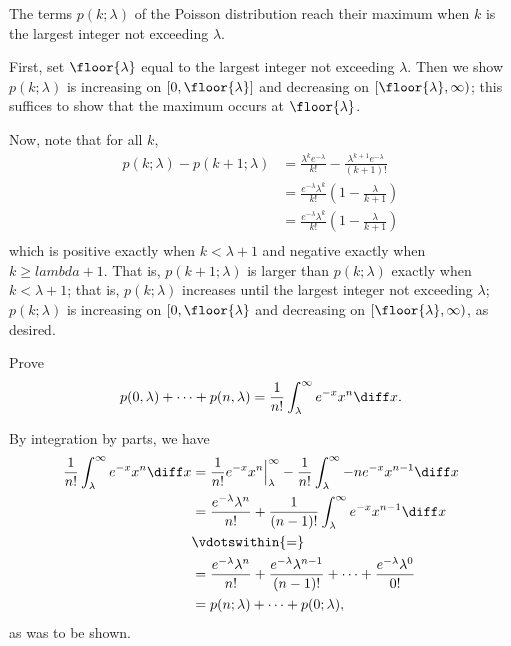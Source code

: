 \begin{problem}[Handout 10, \# 10]
  The terms \(p(k;\lambda)\) of the Poisson distribution reach their
  maximum when \(k\) is the largest integer not exceeding \(\lambda\).
\end{problem}
\begin{solution}
  First, set $\floor{\lambda}$ equal to the largest integer not exceeding
  $\lambda$. Then we show $p(k;\lambda)$ is increasing on
  $[0,\floor{\lambda}]$ and decreasing on $[\floor{\lambda}, \infty)$; this
  suffices to show that the maximum occurs at $\floor{\lambda}$.

  Now, note that for all $k$,
  \begin{align*}
    p(k; \lambda) - p(k+1;\lambda) &= \frac{\lambda^k e^{-\lambda}}{k!} -\frac{\lambda^{k+1} e^{-\lambda}}{(k+1)!}\\
                                   &= \frac{e^{-\lambda} \lambda^k}{k!} \left( 1 -\frac{\lambda}{k+1} \right)\\
                                   &= \frac{e^{-\lambda} \lambda^k}{k!} \left( 1 -\frac{\lambda}{k+1} \right)\\
  \end{align*}
  which is positive exactly when $k < \lambda +1$ and negative exactly when
  $k \geq lambda +1$. That is, $p(k+1;\lambda)$ is larger than
  $p(k; \lambda)$ exactly when $k < \lambda +1$; that is, $p(k;\lambda)$
  increases until the largest integer not exceeding $\lambda$;
  $p(k;\lambda)$ is increasing on $[0,\floor{\lambda}$ and decreasing on
  $[\floor{\lambda},\infty)$, as desired.
\end{solution}
\newpage

\begin{problem}[Handout 10, \# 11]
  Prove
  \[
    p(0,\lambda)+\dotsb+p(n,\lambda)
    =\frac{1}{n!}\int_\lambda^\infty e^{-x}x^n\diff x.
  \]
\end{problem}
\begin{solution}
  By integration by parts, we have
  \begin{align*}
    \frac{1}{n!}\int_\lambda^\infty e^{-x}x^n\diff x
    &=\frac{1}{n!}e^{-x}x^n\Bigr|_\lambda^\infty-\frac{1}{n!}\int_\lambda^\infty
      -ne^{-x}x^{n-1}\diff x\\
    &=\frac{e^{-\lambda}\lambda^n}{n!}+\frac{1}{(n-1)!}\int_\lambda^\infty
      e^{-x}x^{n-1}\diff x\\
    &\vdotswithin{=}\\
    &=\frac{e^{-\lambda}\lambda^n}{n!}+\frac{e^{-\lambda}\lambda^{n-1}}{(n-1)!}+\dotsb+
      \frac{e^{-\lambda}\lambda^{0}}{0!}\\
    &=p(n;\lambda)+\dotsb+p(0;\lambda),
  \end{align*}
  as was to be shown.
\end{solution}
\newpage

